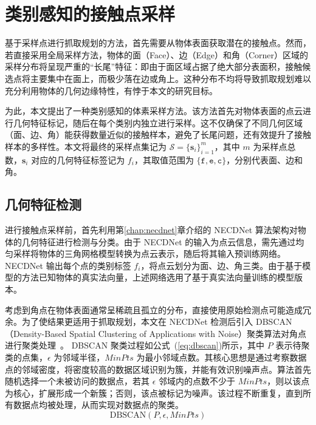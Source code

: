 \section{类别感知的接触点采样}

基于采样点进行抓取规划的方法，首先需要从物体表面获取潜在的接触点。然而，若直接采用全局采样方法，物体的面（Face）、边（Edge）和角（Corner）区域的采样分布将呈现严重的“长尾”特征：即由于面区域占据了绝大部分表面积，接触候选点将主要集中在面上，而极少落在边或角上。这种分布不均将导致抓取规划难以充分利用物体的几何边缘特性，有悖于本文的研究目标。

为此，本文提出了一种类别感知的体素采样方法。该方法首先对物体表面的点云进行几何特征标记，随后在每个类别内独立进行采样。这不仅确保了不同几何区域（面、边、角）能获得数量近似的接触样本，避免了长尾问题，还有效提升了接触样本的多样性。本文将最终的采样点集记为 $\mathcal{S} = \{\mathbf{s}_i\}_{i=1}^m$，其中 $m$ 为采样点总数，$\mathbf{s}_i$ 对应的几何特征标签记为 $f_i$，其取值范围为 $\{\mathtt{f}, \mathtt{e}, \mathtt{c}\}$，分别代表面、边和角。

\subsection{几何特征检测}

进行接触点采样前，首先利用第\ref{chap:necdnet}章介绍的 NECDNet 算法架构对物体的几何特征进行检测与分类。由于 NECDNet 的输入为点云信息，需先通过均匀采样将物体的三角网格模型转换为点云表示，随后将其输入预训练网络。NECDNet 输出每个点的类别标签 $f_i$，将点云划分为面、边、角三类。由于基于模型的方法已知物体的真实法向量，上述网络选用了基于真实法向量训练的模型版本。

考虑到角点在物体表面通常呈稀疏且孤立的分布，直接使用原始检测点可能造成冗余。为了使结果更适用于抓取规划，本文在 NECDNet 检测后引入 DBSCAN（Density-Based Spatial Clustering of Applications with Noise）聚类算法对角点进行聚类处理~\cite{ester_densitybased_1996}。
DBSCAN 聚类过程如公式~(\ref{eq:dbscan})所示，其中 $P$ 表示待聚类的点集，$\epsilon$ 为邻域半径，$MinPts$ 为最小邻域点数。其核心思想是通过考察数据点的邻域密度，将密度较高的数据区域识别为簇，并能有效识别噪声点。算法首先随机选择一个未被访问的数据点，若其 $\epsilon$ 邻域内的点数不少于 $MinPts$，则以该点为核心，扩展形成一个新簇；否则，该点被标记为噪声。该过程不断重复，直到所有数据点均被处理，从而实现对数据点的聚类。
\begin{equation}
    \text{DBSCAN}(P, \epsilon, MinPts)
    \label{eq:dbscan}
\end{equation}

